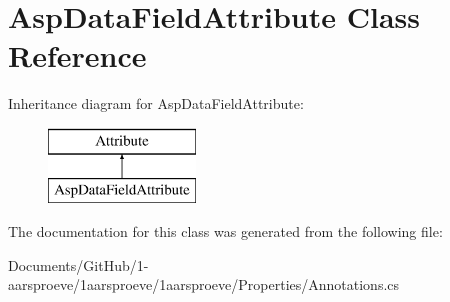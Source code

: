 \hypertarget{class_asp_data_field_attribute}{}\section{Asp\+Data\+Field\+Attribute Class Reference}
\label{class_asp_data_field_attribute}
Inheritance diagram for Asp\+Data\+Field\+Attribute\+:\begin{figure}[H]
\begin{center}
\leavevmode
\includegraphics[height=2.000000cm]{class_asp_data_field_attribute}
\end{center}
\end{figure}


The documentation for this class was generated from the following file\+:\begin{DoxyCompactItemize}
\item 
Documents/\+Git\+Hub/1-\/aarsproeve/1aarsproeve/1aarsproeve/\+Properties/Annotations.\+cs\end{DoxyCompactItemize}
